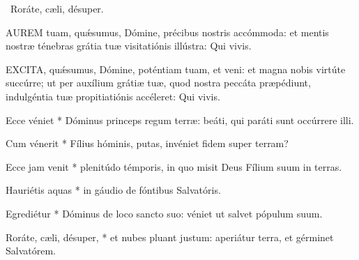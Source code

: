 \V\ Roráte, cæli, désuper.



\lettrine[lines=2]{A}{UREM} tuam, quǽsumus, Dómine, précibus nostris accómmoda: et mentis nostræ ténebras grátia tuæ visitatiónis illústra: Qui vivis.



\lettrine[lines=2]{E}{XCITA}, quǽsumus, Dómine, poténtiam tuam, et veni: et magna nobis virtúte succúrre; ut per auxílium grátiæ tuæ, quod nostra peccáta præpédiunt, indulgéntia tuæ propitiatiónis accéleret: Qui vivis.






 Ecce véniet * Dóminus princeps regum terræ: beáti, qui paráti sunt occúrrere illi.


 Cum vénerit * Fílius hóminis, putas, invéniet fidem super terram?

 Ecce jam venit * plenitúdo témporis, in quo misit Deus Fílium suum in terras.

 Hauriétis aquas * in gáudio de fóntibus Salvatóris.

 Egrediétur * Dóminus de loco sancto suo: véniet ut salvet pópulum suum.




 Roráte, cæli, désuper, * et nubes pluant justum: aperiátur terra, et gérminet Salvatórem.


